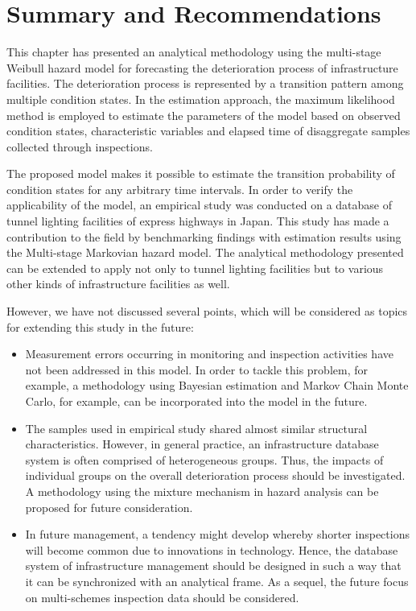 \section{Summary and Recommendations}
\label{36}
This chapter has presented an analytical methodology using the multi-stage Weibull hazard model for forecasting the deterioration process of infrastructure facilities. The deterioration process is represented by a transition pattern among multiple condition states. In the estimation approach, the maximum likelihood method is employed to estimate the parameters of the model based on observed condition states, characteristic variables and elapsed time of disaggregate samples collected through  inspections.

The proposed model makes it possible to estimate the transition probability of condition states for any arbitrary time intervals. In order to verify the applicability of the model, an empirical study was conducted on a database of tunnel lighting facilities of express highways in Japan. This study has made a contribution to the field by benchmarking findings  with estimation results using the Multi-stage Markovian hazard model. The analytical methodology presented can be extended to apply not only to tunnel lighting facilities but to various other kinds of infrastructure facilities as well.

However, we have not discussed several points, which will be considered as topics for extending this study in the future:
\begin{itemize}
 \item Measurement errors occurring in monitoring and inspection activities have not been addressed in this model. In order to tackle this problem, for example, a methodology using Bayesian estimation and Markov Chain Monte Carlo, for example, can be incorporated into the model in the future.
 \item The samples used in empirical study shared almost similar structural characteristics. However, in general practice, an infrastructure database system is often comprised of heterogeneous groups. Thus, the impacts of individual groups on the overall deterioration process should be investigated. A methodology using the mixture mechanism in hazard analysis can be proposed for future consideration.
 \item In future management, a tendency might develop whereby shorter inspections will become common due to innovations in technology. Hence, the database system of infrastructure management should be designed in such a way that it can be synchronized with an analytical frame. As a sequel, the future focus on multi-schemes inspection data should be considered.
\end{itemize}